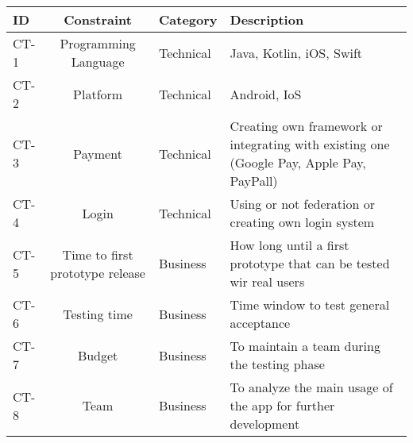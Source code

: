 \begin{table}[htb]
    \begin{tabularx}{\textwidth}{lclX}
        \toprule
        ID & Constraint & Category & Description \\
        \midrule
        CT-1 & Programming Language & Technical & Java, Kotlin, iOS, Swift \\
        CT-2 & Platform & Technical & Android, IoS \\
        CT-3 & Payment & Technical & Creating own framework or integrating with existing one (Google Pay, Apple Pay, PayPall) \\
        CT-4 & Login & Technical & Using or not federation or creating own login system  \\
        CT-5 & Time to first prototype release & Business & How long until a first prototype that can be tested wir real users  \\
        CT-6 & Testing time & Business & Time window to test general acceptance \\
        CT-7 & Budget & Business & To maintain a team during the testing phase \\
        CT-8 & Team & Business & To analyze the main usage of the app for further development \\
        \bottomrule
    \end{tabularx}
\end{table}












